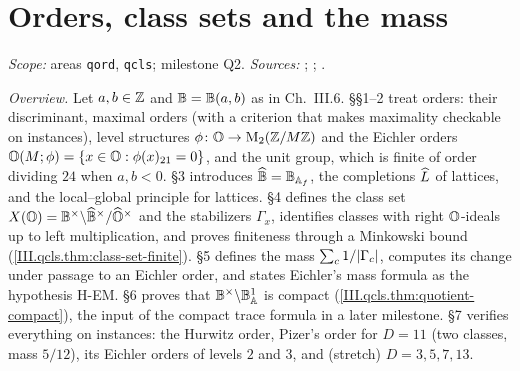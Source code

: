 
\chapter{Orders, class sets and the mass}\label{ch:ch-iii-07-orders}

\noindent\emph{Scope:} areas \texttt{qord}, \texttt{qcls}; milestone Q2. \emph{Sources:} \cite[Prop.~1.1, Def.~1.2, Def.~1.7, Thm.~1.10, pp.~344--348;
Def.~2.13, p.~353]{Piz}; \cite[(20)--(21), p.~180]{Shz}; \cite{Voi}.

\noindent\emph{Overview.} Let $a,b\in\mathbb{Z}$ and $\mathbb{B}=\mathbb{B}(a,b)$ as in Ch.~III.6. §§1--2 treat orders: their discriminant, maximal orders (with a
criterion that makes maximality checkable on instances), level structures $\phi\colon\mathbb{O}\to\mathrm{M}_2(\mathbb{Z}/M\mathbb{Z})$ and the Eichler orders
$\mathbb{O}(M;\phi)=\{x\in\mathbb{O}:\phi(x)_{21}=0\}$, and the unit group, which is finite of order dividing $24$ when $a,b<0$. §3 introduces
$\widehat{\mathbb{B}}=\mathbb{B}_{\mathbb{A}_f}$, the completions $\widehat{L}$ of lattices, and the local--global principle for lattices. §4 defines the class set
$X(\mathbb{O})=\mathbb{B}^\times\backslash\widehat{\mathbb{B}}^\times/\widehat{\mathbb{O}}^\times$ and the stabilizers $\Gamma_x$, identifies classes with right $\mathbb{O}$-ideals up to left
multiplication, and proves finiteness through a Minkowski bound (\cref{III.qcls.thm:class-set-finite}). §5 defines the mass
$\sum_c1/\lvert\Gamma_c\rvert$, computes its change under passage to an Eichler order, and states Eichler's mass formula as the hypothesis H-EM.
§6 proves that $\mathbb{B}^\times\backslash\mathbb{B}_{\mathbb{A}}^1$ is compact (\cref{III.qcls.thm:quotient-compact}), the input of the compact trace formula in a
later milestone. §7 verifies everything on instances: the Hurwitz order, Pizer's order for $D=11$ (two classes, mass $5/12$), its Eichler orders of
levels $2$ and $3$, and (stretch) $D=3,5,7,13$.

